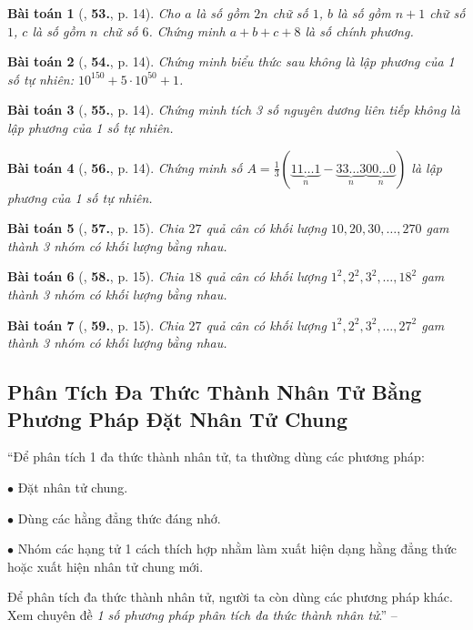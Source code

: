 \documentclass{article}
\numberwithin{equation}{section}
\newtheorem{baitoan}{Bài toán}[section]
\begin{document}
\begin{baitoan}[\cite{Binh_Toan_8_tap_1}, \textbf{53.}, p. 14]
	Cho $a$ là số gồm $2n$ chữ số $1$, $b$ là số gồm $n + 1$ chữ số $1$, $c$ là số gồm $n$ chữ số $6$. Chứng minh $a + b + c + 8$ là số chính phương.
\end{baitoan}

\begin{baitoan}[\cite{Binh_Toan_8_tap_1}, \textbf{54.}, p. 14]
	Chứng minh biểu thức sau không là lập phương của 1 số tự nhiên: $10^{150} + 5\cdot 10^{50} + 1$.
\end{baitoan}

\begin{baitoan}[\cite{Binh_Toan_8_tap_1}, \textbf{55.}, p. 14]
	Chứng minh tích 3 số nguyên dương liên  tiếp không là lập phương của 1 số tự nhiên.
\end{baitoan}

\begin{baitoan}[\cite{Binh_Toan_8_tap_1}, \textbf{56.}, p. 14]
	Chứng minh số $A = \frac{1}{3}(\underbrace{11\ldots 1}_n - \underbrace{33\ldots 3}_n\underbrace{00\ldots 0}_n)$ là lập phương của 1 số tự nhiên.
\end{baitoan}

\begin{baitoan}[\cite{Binh_Toan_8_tap_1}, \textbf{57.}, p. 15]
	Chia $27$ quả cân có khối lượng $10,20,30,\ldots,270$ gam thành 3 nhóm có khối lượng bằng nhau.
\end{baitoan}

\begin{baitoan}[\cite{Binh_Toan_8_tap_1}, \textbf{58.}, p. 15]
	Chia $18$ quả cân có khối lượng $1^2,2^2,3^2,\ldots,18^2$ gam thành 3 nhóm có khối lượng bằng nhau.
\end{baitoan}

\begin{baitoan}[\cite{Binh_Toan_8_tap_1}, \textbf{59.}, p. 15]
	Chia $27$ quả cân có khối lượng $1^2,2^2,3^2,\ldots,27^2$ gam thành 3 nhóm có khối lượng bằng nhau.
\end{baitoan}


\subsection{Phân Tích Đa Thức Thành Nhân Tử Bằng Phương Pháp Đặt Nhân Tử Chung}
``Để phân tích 1 đa thức thành nhân tử, ta thường dùng các phương pháp:
\begin{enumerate*}
	\item[$\bullet$] Đặt nhân tử chung.
	\item[$\bullet$] Dùng các hằng đẳng thức đáng nhớ.
	\item[$\bullet$] Nhóm các  hạng tử 1 cách thích hợp nhằm làm xuất hiện dạng hằng đẳng thức hoặc xuất hiện nhân tử chung mới.
\end{enumerate*}
Để phân tích đa thức thành nhân tử, người ta còn dùng các phương pháp khác. Xem chuyên đề \textit{1 số phương pháp phân tích đa thức thành nhân tử}.'' -- \cite[p. 15]{Binh_Toan_8_tap_1}
\end{document}
